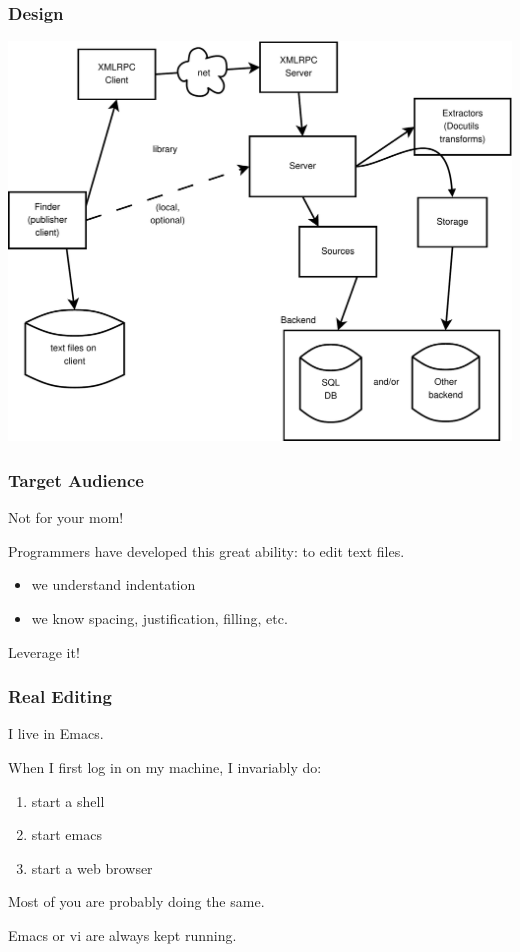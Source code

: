 \documentclass[compress,trans]{beamer}
\begin{document}
\begin{frame}[fragile]
  \frametitle{Design}

\includegraphics[width=1.0\textwidth]{../nabu1.pdf}

\end{frame}



\begin{frame}[fragile]
  \frametitle{Target Audience}
 
 Not for your mom!
\vfill
 
\pause
 Programmers have developed this great ability: to edit text files.
 
 \begin{itemize}
 \item we understand indentation
 \item we know spacing, justification, filling, etc.
 \end{itemize}
 
 Leverage it!
 
\end{frame}

 
\begin{frame}[fragile]
  \frametitle{Real Editing}

I live in Emacs.

When I first log in on my machine, I invariably do:
\begin{enumerate}
\item start a shell
\item start emacs
\item start a web browser
\end{enumerate}

Most of you are probably doing the same.

Emacs or vi are always kept running.
 
\end{frame}
 
\end{document}
